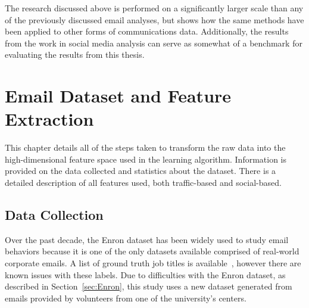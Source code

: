 \documentclass[12pt]{report}
\begin{document}
The research discussed above is performed on a significantly larger scale than any of the previously discussed email analyses, but shows how the same methods have been applied to other forms of communications data.
Additionally, the results from the work in social media analysis can serve as somewhat of a benchmark for evaluating the results from this thesis.

\chapter{Email Dataset and Feature Extraction} \label{Data}
This chapter details all of the steps taken to transform the raw data into the high-dimensional feature space used in the learning algorithm.
Information is provided on the data collected and statistics about the dataset.
There is a detailed description of all features used, both traffic-based and social-based.

\section{Data Collection}
Over the past decade, the Enron dataset has been widely used to study email behaviors because it is one of the only datasets available comprised of real-world corporate emails.
A list of ground truth job titles is available~\cite{shetty_status_2004}, however there are known issues with these labels.
Due to difficulties with the Enron dataset, as described in Section~\ref{sec:Enron}, this study uses a new dataset generated from emails provided by volunteers from one of the university's centers.
\end{document}

